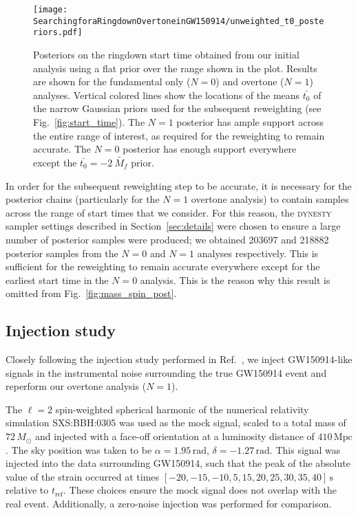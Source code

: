 \begin{figure}[b!]
    \centering
    \texttt{[image: SearchingforaRingdownOvertoneinGW150914/unweighted\_t0\_posteriors.pdf]}
    \caption[Posteriors on the GW150914 ringdown start time]{ 
    Posteriors on the ringdown start time obtained from our initial analysis using a flat prior over the range shown in the plot.
    Results are shown for the fundamental only ($N=0$) and overtone ($N=1$) analyses.
    Vertical colored lines show the locations of the means $\bar{t_0}$ of the narrow Gaussian priors used for the subsequent reweighting (see Fig.~\ref{fig:start_time}).
    The $N=1$ posterior has ample support across the entire range of interest, as required for the reweighting to remain accurate.
    The $N=0$ posterior has enough support everywhere except the $\bar{t_0}=-2\ \tilde{M_f}$ prior.
    }
    \label{fig:t0_posterior}
\end{figure}

In order for the subsequent reweighting step to be accurate, it is necessary for the posterior chains (particularly for the $N=1$ overtone analysis) to contain samples across the range of start times that we consider. 
For this reason, the \textsc{dynesty} sampler settings described in Section~\ref{sec:details} were chosen to ensure a large number of posterior samples were produced; we obtained 203697 and 218882 posterior samples from the $N=0$ and $N=1$ analyses respectively. 
This is sufficient for the reweighting to remain accurate everywhere except for the earliest start time in the $N=0$ analysis. 
This is the reason why this result is omitted from Fig.~\ref{fig:mass_spin_post}.


\subsection{Injection study}\label{app:inj}

Closely following the injection study performed in Ref.~\cite{Cotesta:2022pci}, we inject GW150914-like signals in the instrumental noise surrounding the true GW150914 event and reperform our overtone analysis ($N=1$).

The $\ell=2$ spin-weighted spherical harmonic of the numerical relativity simulation SXS:BBH:0305 \cite{Lovelace:2016uwp, sxs_catalog} was used as the mock signal, scaled to a total mass of $72\,M_\odot$ and injected with a face-off orientation at a luminosity distance of $410\,\mathrm{Mpc}$. 
The sky position was taken to be $\alpha = 1.95\,\mathrm{rad}$, $\delta=-1.27\,\mathrm{rad}$.
This signal was injected into the data surrounding GW150914, such that the peak of the absolute value of the strain occurred at times $[-20, -15, -10, 5, 15, 20, 25, 30, 35, 40]\,\mathrm{s}$ relative to $t_\mathrm{ref}$.
These choices ensure the mock signal does not overlap with the real event.
Additionally, a zero-noise injection was performed for comparison. 

